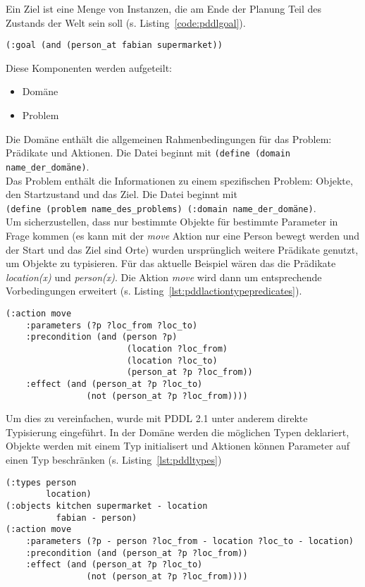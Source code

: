 Ein Ziel ist eine Menge von Instanzen, die am Ende der Planung Teil des Zustands der Welt sein soll (s. Listing~\ref{code:pddlgoal}).
\begin{lstlisting}[caption={Ziel in \acs{PDDL}},language=pddl,label=code:pddlgoal]
(:goal (and (person_at fabian supermarket))
\end{lstlisting}
Diese Komponenten werden aufgeteilt:
\begin{itemize}
    \item Domäne
    \item Problem
\end{itemize}
Die Domäne enthält die allgemeinen Rahmenbedingungen für das Problem: Prädikate und Aktionen.
Die Datei beginnt mit \verb|(define (domain name_der_domäne)|.\\
Das Problem enthält die Informationen zu einem spezifischen Problem: Objekte, den Startzustand und das Ziel.
Die Datei beginnt mit\\\verb|(define (problem name_des_problems) (:domain name_der_domäne)|.\\
Um sicherzustellen, dass nur bestimmte Objekte für bestimmte Parameter in Frage kommen (es kann mit der \emph{move} Aktion nur eine Person bewegt werden und der Start und das Ziel sind Orte) wurden ursprünglich weitere Prädikate genutzt, um Objekte zu typisieren.
Für das aktuelle Beispiel wären das die Prädikate \emph{location(x)} und \emph{person(x)}.
Die Aktion \emph{move} wird dann um entsprechende Vorbedingungen erweitert (s. Listing~\ref{lst:pddlactiontypepredicates}).
\begin{lstlisting}[caption={Move Aktion mit Prädikaten zur Typisierung},language=pddl,label={lst:pddlactiontypepredicates}]
(:action move
    :parameters (?p ?loc_from ?loc_to)
    :precondition (and (person ?p)
                        (location ?loc_from)
                        (location ?loc_to)
                        (person_at ?p ?loc_from))
    :effect (and (person_at ?p ?loc_to)
                (not (person_at ?p ?loc_from))))
\end{lstlisting}
Um dies zu vereinfachen, wurde mit \acs{PDDL} 2.1 unter anderem direkte Typisierung eingeführt.
In der Domäne werden die möglichen Typen deklariert, Objekte werden mit einem Typ initialisert und Aktionen können Parameter auf einen Typ beschränken (s. Listing~\ref{lst:pddltypes})
\begin{lstlisting}[caption={Typ Unterstützung in \acs{PDDL} 2.1},language=pddl,label={lst:pddltypes}]
(:types person
        location)
(:objects kitchen supermarket - location
          fabian - person)
(:action move
    :parameters (?p - person ?loc_from - location ?loc_to - location)
    :precondition (and (person_at ?p ?loc_from))
    :effect (and (person_at ?p ?loc_to)
                (not (person_at ?p ?loc_from))))
\end{lstlisting}
